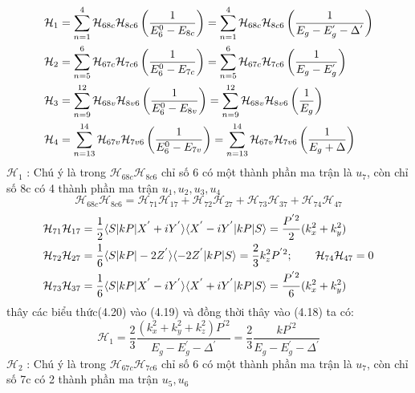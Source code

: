 \begin{align}
\mathcal{H}_1 &=\sum_{n=1}^4\mathcal{H}_{68c}\mathcal{H}_{8c6}\left(\frac{1}{E_6^0 -E_{8c}}\right)=
\sum_{n=1}^4\mathcal{H}_{68c}\mathcal{H}_{8c6}\left(\frac{1}{E_g -E_g^{'} -\Delta^{'}}\right)\notag\\
\mathcal{H}_2 &=\sum_{n=5}^6\mathcal{H}_{67c}\mathcal{H}_{7c6}\left(\frac{1}{E_6^0 -E_{7c}}\right)=\sum_{n=5}^6\mathcal{H}_{67c}\mathcal{H}_{7c6}\left(\frac{1}{E_g -E_g^{'}}\right) \notag\\
\mathcal{H}_3 &=\sum_{n=9}^{12}\mathcal{H}_{68v}\mathcal{H}_{8v6}\left(\frac{1}{E_6^0 -E_{8v}}\right)=\sum_{n=9}^{12}\mathcal{H}_{68v}\mathcal{H}_{8v6}\left(\frac{1}{E_g}\right) \notag\\
\mathcal{H}_4 &=\sum_{n=13}^{14}\mathcal{H}_{67v}\mathcal{H}_{7v6}\left(\frac{1}{E_6^0 -E_{7v}}\right)=\sum_{n=13}^{14}\mathcal{H}_{67v}\mathcal{H}_{7v6}\left(\frac{1}{E_g +\Delta}\right)
\end{align}
$\mathcal{H}_1$ : Chú ý là trong $\mathcal{H}_{68c}\mathcal{H}_{8c6}$ chỉ số 6 có một thành phần ma trận là $u_7$, còn chỉ số 8c có 4 thành phần ma trận $u_1,u_2,u_3,u_4$
\begin{equation}
\mathcal{H}_{68c}\mathcal{H}_{8c6}=\mathcal{H}_{71}\mathcal{H}_{17} +\mathcal{H}_{72}\mathcal{H}_{27} +\mathcal{H}_{73}\mathcal{H}_{37} +\mathcal{H}_{74}\mathcal{H}_{47}
\end{equation}
\begin{align}
\mathcal{H}_{71}\mathcal{H}_{17} &=\frac{1}{2}\langle S |kP|X^{'}+iY^{'}\rangle \langle X^{'}-iY^{'}|kP| S \rangle = \frac{P^{'2}}{2}(k_x^2 +k_y^2)\notag\\
\mathcal{H}_{72}\mathcal{H}_{27} &=\frac{1}{6}\langle S |kP|-2Z^{'}\rangle \langle -2Z^{'}|kP| S \rangle = \frac{2}{3}k_z^2P^{'2};\qquad \mathcal{H}_{74}\mathcal{H}_{47}=0\notag\\
\mathcal{H}_{73}\mathcal{H}_{37} &=\frac{1}{6}\langle S |kP|X^{'}-iY^{'}\rangle \langle X^{'}+iY^{'}|kP| S \rangle = \frac{P^{'2}}{6}(k_x^2 +k_y^2)
\end{align}
thây các biểu thức(4.20) vào (4.19) và đồng thời thây vào (4.18) ta có:
\begin{equation}
\mathcal{H}_1 =\frac{2}{3}\frac{(k_x^2 +k_y^2 +k_z^2)P^{'2}}{E_g -E_g^{'} -\Delta^{'}}=\frac{2}{3}\frac{kP^{'2}}{E_g -E_g^{'} -\Delta^{'}}
\end{equation}
$\mathcal{H}_2$ : Chú ý là trong $\mathcal{H}_{67c}\mathcal{H}_{7c6}$ chỉ số 6 có một thành phần ma trận là $u_7$, còn chỉ số 7c có 2 thành phần ma trận $u_5,u_6$

